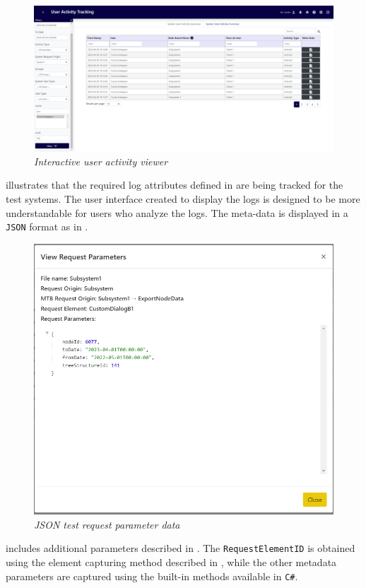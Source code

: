 \begin{figure}[!htb]
	\centering %
	\includegraphics[width=0.99\linewidth]{img/ch3/analysis/UAT_menu.png}
	\caption[Interactive user activity viewer]
	{\textit{Interactive user activity viewer}}\label{fig:ch3_UAT_menu}
\end{figure}

 illustrates that the required log attributes defined in  are being tracked for the test systems. The user interface created to display the logs is designed to be more understandable for users who analyze the logs. The meta-data is displayed in a \texttt{JSON} format as in .

\clearpage

\begin{figure}[!htb]
	\centering %
	\includegraphics[width=0.65\linewidth]{img/ch3/analysis/UAT_request_params.png}
	\caption[JSON test request parameter data]
	{\textit{JSON test request parameter data}}\label{fig:ch3_JSON_Test_Result}
\end{figure}

 includes additional parameters described in . The \texttt{RequestElementID} is obtained using the element capturing method described in , while the other metadata parameters are captured using the built-in methods available in \texttt{C\#}.

